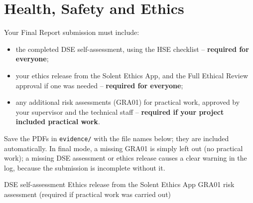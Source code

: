 \chapter{Health, Safety and Ethics}
\label{app:hse}

\begin{guidance}
Your Final Report submission must include:
\begin{itemize}
  \item the completed DSE self-assessment, using the HSE checklist
    \parencite{hse2013dse} -- \textbf{required for everyone};
  \item your ethics release from the Solent Ethics App, and the Full Ethical
    Review approval if one was needed -- \textbf{required for everyone};
  \item any additional risk assessments (GRA01) for practical work, approved
    by your supervisor and the technical staff -- \textbf{required if your
    project included practical work}.
\end{itemize}
Save the PDFs in \texttt{evidence/} with the file names below; they are
included automatically. In final mode, a missing GRA01 is simply left out
(no practical work); a missing DSE assessment or ethics release causes a
clear warning in the log, because the submission is incomplete without it.
\end{guidance}

  {DSE self-assessment}
  {Ethics release from the Solent Ethics App}
  {GRA01 risk assessment (required if practical work was carried out)}
